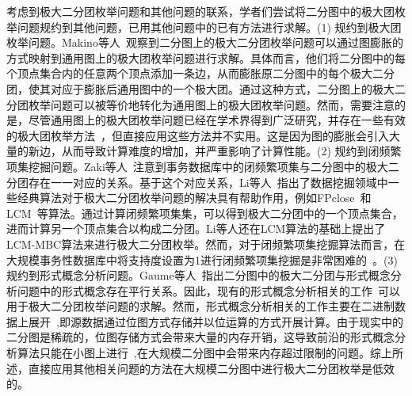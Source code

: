 考虑到极大二分团枚举问题和其他问题的联系，学者们尝试将二分图中的极大团枚举问题规约到其他问题，已用其他问题中的已有方法进行求解。(1) 规约到极大团枚举问题。Makino等人~\cite{Makino04}观察到二分图上的极大二分团枚举问题可以通过图膨胀的方式映射到通用图上的极大团枚举问题进行求解。具体而言，他们将二分图中的每个顶点集合内的任意两个顶点添加一条边，从而膨胀原二分图中的每个极大二分团，使其对应于膨胀后通用图中的一个极大团。通过这种方式，二分图上的极大二分团枚举问题可以被等价地转化为通用图上的极大团枚举问题。然而，需要注意的是，尽管通用图上的极大团枚举问题已经在学术界得到广泛研究，并存在一些有效的极大团枚举方法~\cite{MCEparallel20,MCE20,MCE22,MCE-GPU21,MCE-22}，但直接应用这些方法并不实用。这是因为图的膨胀会引入大量的新边，从而导致计算难度的增加，并严重影响了计算性能。(2) 规约到闭频繁项集挖掘问题。Zaki等人~\cite{FCIM98}注意到事务数据库中的闭频繁项集与二分图中的极大二分团存在一一对应的关系。基于这个对应关系，Li等人~\cite{correspondence05}指出了数据挖掘领域中一些经典算法对于极大二分团枚举问题的解决具有帮助作用，例如FPclose~\cite{fpclose04}和LCM~\cite{lcm04}等算法。通过计算闭频繁项集集，可以得到极大二分团中的一个顶点集合，进而计算另一个顶点集合以构成二分团。Li等人还在LCM算法的基础上提出了LCM-MBC算法来进行极大二分团枚举。然而，对于闭频繁项集挖掘算法而言，在大规模事务性数据库中将支持度设置为1进行闭频繁项集挖掘是非常困难的~\cite{iMBEA14}。(3)规约到形式概念分析问题。Gaume等人~\cite{fcambe10}指出二分图中的极大二分团与形式概念分析问题中的形式概念存在平行关系。因此，现有的形式概念分析相关的工作~\cite{FCA15,FCA21,FCA22}可以用于极大二分团枚举问题的求解。然而，形式概念分析相关的工作主要在二进制数据上展开~\cite{FCA15},即源数据通过位图方式存储并以位运算的方式开展计算。由于现实中的二分图是稀疏的，位图存储方式会带来大量的内存开销，这导致前沿的形式概念分析算法只能在小图上进行~\cite{FCA21,FCA22},在大规模二分图中会带来内存超过限制的问题。综上所述，直接应用其他相关问题的方法在大规模二分图中进行极大二分团枚举是低效的。


